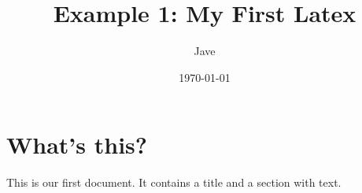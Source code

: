\documentclass[letterpaper, 12pt]{article}
\begin{document}
\title{Example 1: My First Latex}
\author{Jave}
\date{\today}
\maketitle
\section{What's this?}
This is our first document. It contains a title and a section with text.
\end{document}

